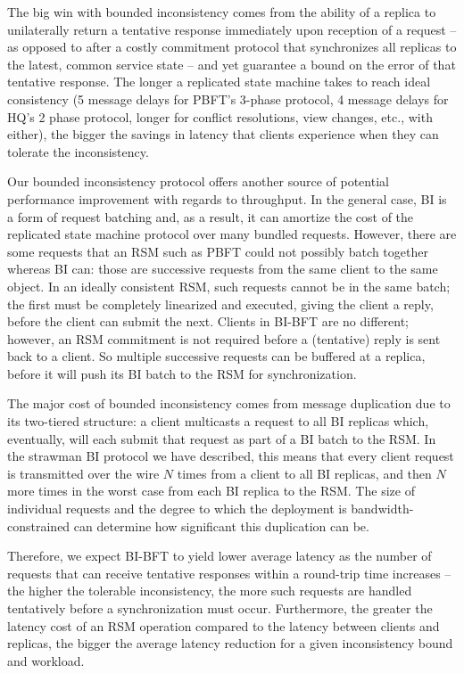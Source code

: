 \documentclass[twocolumn,10pt]{article}
\begin{document}
The big win with bounded inconsistency comes from the ability of a
replica to unilaterally return a tentative response immediately upon
reception of a request -- as opposed to after a costly commitment
protocol that synchronizes all replicas to the latest, common service
state -- and yet guarantee a bound on the error of that
tentative response.   The longer a replicated state machine takes to
reach ideal consistency (5 message delays for PBFT's 3-phase protocol, 4
message delays for HQ's 2 phase protocol, longer for conflict
resolutions, view changes, etc., with either), the bigger the savings in
latency that clients experience when they can tolerate the
inconsistency.

Our bounded inconsistency protocol offers another source of potential
performance improvement with regards to throughput. In the general case,
BI is a form of request batching and, as a result, it can amortize the
cost of the replicated state machine protocol over many bundled
requests.  However, there are some requests that an RSM such as PBFT
could not possibly batch together whereas BI can: those are successive
requests from the same client to the same object. In an ideally
consistent RSM, such requests cannot be in the same batch; the first
must be completely linearized and executed, giving the client a reply,
before the client can submit the next.  Clients in BI-BFT are no
different; however, an RSM commitment is not required before a
(tentative) reply is
sent back to a client. So multiple successive requests can be buffered
at a replica, before it will push its BI batch to the RSM for
synchronization.

The major cost of bounded inconsistency comes from message duplication
due to its two-tiered structure: a client multicasts a request to all BI
replicas which, eventually, will each submit that request as part of a
BI batch to the RSM.  In the strawman BI protocol we have described,
this means that every client request is transmitted over the wire $N$
times from a client to all BI replicas, and then $N$ more times in the
worst case from each BI replica to the RSM.  The size of individual
requests and the degree to which the deployment is bandwidth-constrained
can determine how significant this duplication can be.

Therefore, we expect BI-BFT to yield lower average latency as the number
of requests that can receive tentative responses within a round-trip
time increases -- the higher the tolerable inconsistency, the more such
requests are handled tentatively before a synchronization must occur.
Furthermore, the greater the latency cost of an RSM
operation compared to the latency between clients and replicas, the
bigger the average latency reduction for a given inconsistency bound and
workload.
\end{document}

